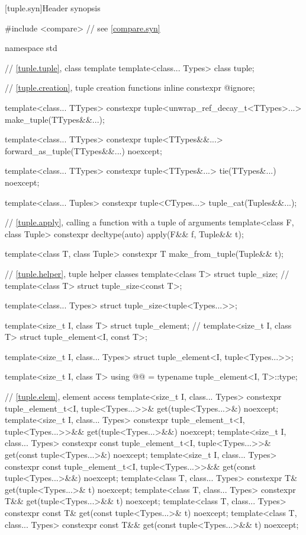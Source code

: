 [tuple.syn]{Header  synopsis}

%
\begin{codeblock}
#include <compare>              // see \ref{compare.syn}

namespace std {
  // \ref{tuple.tuple}, class template 
  template<class... Types>
    class tuple;

  // \ref{tuple.creation}, tuple creation functions
  inline constexpr @\unspec@ ignore;

  template<class... TTypes>
    constexpr tuple<unwrap_ref_decay_t<TTypes>...> make_tuple(TTypes&&...);

  template<class... TTypes>
    constexpr tuple<TTypes&&...> forward_as_tuple(TTypes&&...) noexcept;

  template<class... TTypes>
    constexpr tuple<TTypes&...> tie(TTypes&...) noexcept;

  template<class... Tuples>
    constexpr tuple<CTypes...> tuple_cat(Tuples&&...);

  // \ref{tuple.apply}, calling a function with a tuple of arguments
  template<class F, class Tuple>
    constexpr decltype(auto) apply(F&& f, Tuple&& t);

  template<class T, class Tuple>
    constexpr T make_from_tuple(Tuple&& t);

  // \ref{tuple.helper}, tuple helper classes
  template<class T> struct tuple_size;                  // \notdef
  template<class T> struct tuple_size<const T>;

  template<class... Types> struct tuple_size<tuple<Types...>>;

  template<size_t I, class T> struct tuple_element;     // \notdef
  template<size_t I, class T> struct tuple_element<I, const T>;

  template<size_t I, class... Types>
    struct tuple_element<I, tuple<Types...>>;

  template<size_t I, class T>
    using @@ = typename tuple_element<I, T>::type;

  // \ref{tuple.elem}, element access
  template<size_t I, class... Types>
    constexpr tuple_element_t<I, tuple<Types...>>& get(tuple<Types...>&) noexcept;
  template<size_t I, class... Types>
    constexpr tuple_element_t<I, tuple<Types...>>&& get(tuple<Types...>&&) noexcept;
  template<size_t I, class... Types>
    constexpr const tuple_element_t<I, tuple<Types...>>& get(const tuple<Types...>&) noexcept;
  template<size_t I, class... Types>
    constexpr const tuple_element_t<I, tuple<Types...>>&& get(const tuple<Types...>&&) noexcept;
  template<class T, class... Types>
    constexpr T& get(tuple<Types...>& t) noexcept;
  template<class T, class... Types>
    constexpr T&& get(tuple<Types...>&& t) noexcept;
  template<class T, class... Types>
    constexpr const T& get(const tuple<Types...>& t) noexcept;
  template<class T, class... Types>
    constexpr const T&& get(const tuple<Types...>&& t) noexcept;

}
\end{codeblock}
